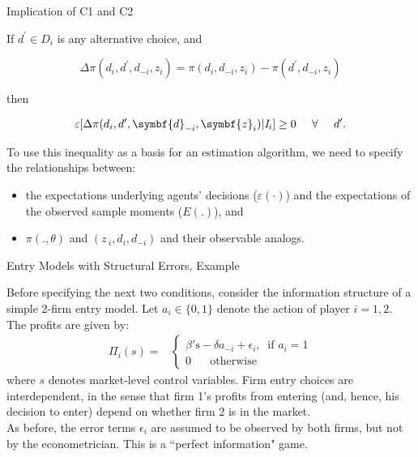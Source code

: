 \begin{frame}{Implication of C1 and C2}

If $d^{\prime }\in D_{i}$ is any alternative choice, and 

\begin{equation}
\Delta \pi (d_{i},d^{\prime },d_{-i},z_{i})=\pi (d_{i},d_{-i},z_{i})-\pi
(d^{\prime },d_{-i},z_{i})
\end{equation}

then%

\begin{equation*}
\varepsilon[ \Delta \pi (d_{i},d^{\prime },\symbf{d}_{-i},\symbf{z}_{i})|\mathit{I}_{i}] \geq 0 \text{ \hspace{0.1in}   } \forall  \text{   \hspace{0.1in}   }d'.
\end{equation*}

To use this inequality as a basis for an estimation algorithm, we need to specify the
relationships between:

\begin{itemize}
\item the expectations underlying agents' decisions (\large{$\varepsilon(\cdot)$}) \normalsize and the expectations of the observed sample moments ($E(.)$), and 

\item $\pi (.,\theta )$ and $(z\,_{i},d_{i},d_{-i})$ and their observable analogs.
\end{itemize}


\end{frame}

\begin{frame}{Entry Models with Structural Errors, Example}

\vspace{2mm}
Before specifying the next two conditions, consider the information structure of a simple 2-firm entry model. Let $a_i \in \{0,1 \}$ denote the action of player $i = 1,2$. The profits are given by:
\begin{equation*}
\begin{split}
\Pi_i (s) =& \left \{
\begin{array}{l} 
\beta' \text{s} - \delta a_{-i} + \epsilon_i , \;\; \text{if } a_i = 1 \\
0 \;\; \;\; \;\; \text{otherwise}
\end{array}
\right. 
\end{split}
\end{equation*}
where $s$ denotes market-level control variables. 
\vfill
Firm entry choices are interdependent, in the sense that firm 1's profits from entering (and, hence, his decision to enter) depend on whether firm 2 is in the market. \\
\vfill
As before, the error terms $\epsilon_i$ are assumed to be observed by both firms, but not by the econometrician. This is a ``perfect information" game. 
\end{frame}

